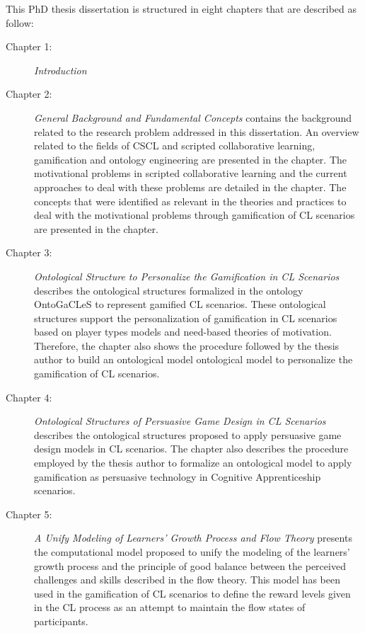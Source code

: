 This PhD thesis dissertation is structured in eight chapters that are described as follow:

\begin{description}

\item[Chapter 1:]
\emph{Introduction}

\item[Chapter 2:]
\emph{General Background and Fundamental Concepts} contains the background related to the research problem addressed in this dissertation.
An overview related to the fields of CSCL and scripted collaborative learning, gamification and ontology engineering are presented in the chapter.
The motivational problems in scripted collaborative learning and the current approaches to deal with these problems are detailed in the chapter.
The concepts that were identified as relevant in the theories and practices to deal with the motivational problems through gamification of CL scenarios are presented in the chapter.

\item[Chapter 3:]
\emph{Ontological Structure to Personalize the Gamification in CL Scenarios} describes the ontological structures formalized in the ontology OntoGaCLeS to represent gamified CL scenarios.
These ontological structures support the personalization of gamification in CL scenarios based on player types models and need-based theories of motivation.
Therefore, the chapter also shows the procedure followed by the thesis author to build an ontological model ontological model to personalize the gamification of CL scenarios.

\item[Chapter 4:]
\emph{Ontological Structures of Persuasive Game Design in CL Scenarios} describes the ontological structures proposed to apply persuasive game design models in CL scenarios.
The chapter also describes the procedure employed by the thesis author to formalize an ontological model to apply gamification as persuasive technology in Cognitive Apprenticeship scenarios.

\item[Chapter 5:]
\emph{A Unify Modeling of Learners' Growth Process and Flow Theory} presents the computational model proposed to unify the modeling of the learners' growth process and the principle of good balance between the perceived challenges and skills described in the flow theory.
This model has been used in the gamification of CL scenarios to define the reward levels given in the CL process as an attempt to maintain the flow states of participants.


\end{description}
